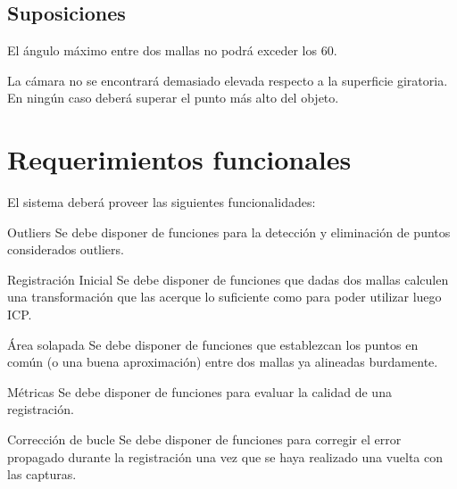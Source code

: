 



		\subsection{Suposiciones}
			El ángulo máximo entre dos mallas no podrá exceder los 60\textdegree.

			La cámara no se encontrará demasiado elevada respecto a la
			superficie giratoria. En ningún caso deberá superar el punto más alto del objeto. %
			\clearpage

	\section{Requerimientos funcionales}    %
		El sistema deberá proveer las siguientes funcionalidades:

		\Requerimiento
			{Outliers}
			{Se debe disponer de funciones para la detección y eliminación de
			puntos considerados outliers.}

		\Requerimiento
			{Registración Inicial}
			{Se debe disponer de funciones que dadas dos mallas calculen una
			transformación que las acerque lo suficiente como para poder
			utilizar luego ICP.}

		\Requerimiento
			{Área solapada}
			{Se debe disponer de funciones que establezcan los puntos en común (o una buena
			aproximación) entre dos mallas ya alineadas burdamente.}

		\Requerimiento
			{Métricas}
			{Se debe disponer de funciones para evaluar la calidad de una registración.}

		\Requerimiento
			{Corrección de bucle}
			{Se debe disponer de funciones para corregir el error propagado durante la registración
			una vez que se haya realizado una vuelta con las capturas.}

